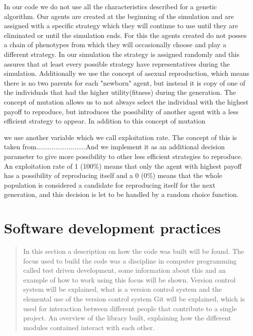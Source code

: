 \documentclass{article}
\begin{document}
In our code we do not use all the characteristics described for a genetic algorithm. Our agents are created at the beginning of the simulation and are assigned with a specific strategy which they will continue to use until they are eliminated or until the simulation ends. For this the agents created do not posses a chain of phenotypes from which they will occasionally choose and play a different strategy. In our simulation the strategy is assigned randomly and this assures that at least every possible strategy have representatives during the simulation. Additionally we use the concept of asexual reproduction, which means there is no two parents for each "newborn" agent, but instead it is copy of one of the individuals that had the higher utility(fitness) during the generation. The concept of mutation allows us to not always select the individual with the highest payoff to reproduce, but introduces the possibility of another agent with a less efficient strategy to appear. In addition to this concept of mutation

we use another variable which we call exploitation rate. The concept of this is taken from..........................And we implement it as   an additional decision parameter to give more possibility to other less efficient strategies to reproduce. An exploitation rate of 1 (100\%) means that only the agent with highest payoff has a possibility of reproducing itself and a 0 (0\%) means that the whole population is considered a candidate for reproducing itself for the next generation, and this decision is let to be handled by a random choice function. 

\newpage
\section{Software development practices}
\maketitle
\begin{abstract}
In this section a description on how the code was built will be found. The focus used to build the code was a discipline in computer programming called test driven development, some information about this and an example of how to work using this focus will be shown. Version control system will be explained, what is a version control system and the elemental use of the version control system Git will be explained, which is used for interaction between different people that contribute to a single project. An overview of the library built, explaining how the different modules contained interact with each other.

\end{abstract}
\end{document}
